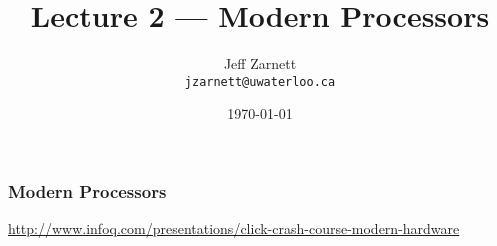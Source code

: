 

\title{Lecture 2 --- Modern Processors }

\author{Jeff Zarnett \\ \small \texttt{jzarnett@uwaterloo.ca}}
\date{\today}




\begin{frame}
  \titlepage

 \end{frame}

\begin{frame}
\frametitle{Modern Processors}

\begin{center}
\url{http://www.infoq.com/presentations/click-crash-course-modern-hardware}
\end{center}


\end{frame}



